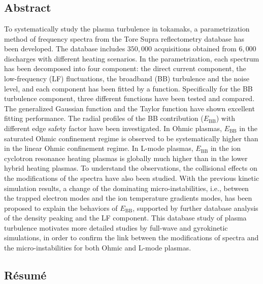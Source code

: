 
\chapter*{}



\section*{Abstract}


To systematically study the plasma turbulence in tokamaks, a parametrization method of frequency spectra from the Tore Supra reflectometry database has been developed. The database includes $350,000$ acquisitions obtained from $6,000$ discharges with different heating scenarios. In the parametrization, each spectrum has been decomposed into four component: the direct current component, the low-frequency (LF) fluctuations, the broadband (BB) turbulence and the noise level, and each component has been fitted by a function. Specifically for the BB turbulence component, three different functions have been tested and compared. The generalized Gaussian function and the Taylor function have shown excellent fitting performance. The radial profiles of the BB contribution ($E_\mathrm{BB}$) with different edge safety factor have been investigated. In Ohmic plasmas, $E_\mathrm{BB}$ in the saturated Ohmic confinement regime is observed to be systematically higher than in the linear Ohmic confinement regime. In L-mode plasmas, $E_\mathrm{BB}$ in the ion cyclotron resonance heating plasmas is globally much higher than in the lower hybrid heating plasmas. To understand the observations, the collisional effects on the modifications of the spectra have also been studied. With the previous kinetic simulation results, a change of the dominating micro-instabilities, i.e., between the trapped electron modes and the ion temperature gradients modes, has been proposed to explain the behaviors of $E_\mathrm{BB}$, supported by further database analysis of the density peaking and the LF component. This database study of plasma turbulence motivates more detailed studies by full-wave and gyrokinetic simulations, in order to confirm the link between the modifications of spectra and the micro-instabilities for both Ohmic and L-mode plasmas.


\section*{R\'{e}sum\'{e}}



